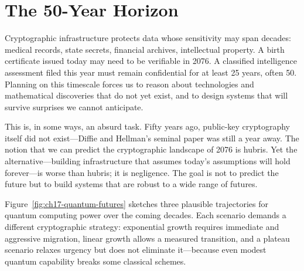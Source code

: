 \section{The 50-Year Horizon}
\label{sec:horizon}

Cryptographic infrastructure protects data whose sensitivity may span decades: medical records, state secrets, financial archives, intellectual property.  A birth certificate issued today may need to be verifiable in 2076.  A classified intelligence assessment filed this year must remain confidential for at least 25 years, often 50.  Planning on this timescale forces us to reason about technologies and mathematical discoveries that do not yet exist, and to design systems that will survive surprises we cannot anticipate.

This is, in some ways, an absurd task.  Fifty years ago, public-key cryptography itself did not exist---Diffie and Hellman's seminal paper was still a year away.  The notion that we can predict the cryptographic landscape of 2076 is hubris.  Yet the alternative---building infrastructure that assumes today's assumptions will hold forever---is worse than hubris; it is negligence.  The goal is not to predict the future but to build systems that are robust to a wide range of futures.

Figure~\ref{fig:ch17-quantum-futures} sketches three plausible trajectories for quantum computing power over the coming decades.  Each scenario demands a different cryptographic strategy: exponential growth requires immediate and aggressive migration, linear growth allows a measured transition, and a plateau scenario relaxes urgency but does not eliminate it---because even modest quantum capability breaks some classical schemes.

